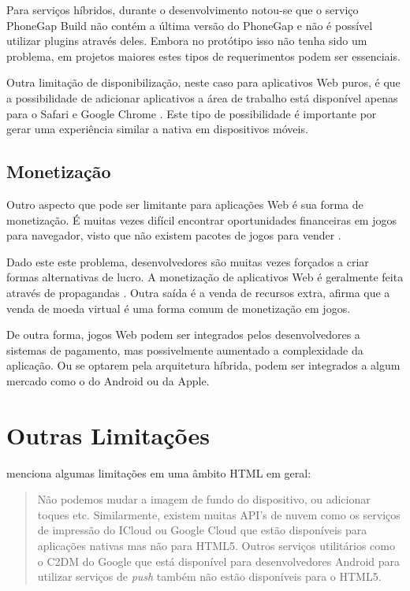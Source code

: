 Para serviços híbridos, durante o desenvolvimento notou-se que o
serviço PhoneGap Build não contém a última versão do PhoneGap e
não é possível utilizar plugins através deles. Embora no protótipo
isso não tenha sido um problema, em projetos maiores estes tipos de
requerimentos podem ser essenciais.

Outra limitação de disponibilização, neste caso para aplicativos
Web puros, é que a possibilidade de adicionar aplicativos a área
de trabalho está disponível apenas para o Safari e Google Chrome
. Este tipo de possibilidade é importante por
gerar uma experiência similar a nativa em dispositivos móveis.

\subsection{Monetização}

Outro aspecto que pode ser limitante para aplicações Web é
sua forma de monetização. É muitas vezes difícil encontrar
oportunidades financeiras em jogos para navegador, visto que não
existem pacotes de jogos para vender \autocite[p. 44]{gameCommunities}
.

Dado este este problema, desenvolvedores são muitas vezes forçados
a criar formas alternativas de lucro. A monetização de aplicativos
Web é geralmente feita através de propagandas \autocite[p.
44]{gameCommunities}. Outra saída é a venda de recursos extra,
\citet[p. 44]{gameCommunities} afirma que a venda de moeda virtual é
uma forma comum de monetização em jogos.

De outra forma, jogos Web podem ser integrados pelos desenvolvedores
a sistemas de pagamento, mas possivelmente aumentado a complexidade
da aplicação. Ou se optarem pela arquitetura híbrida, podem ser
integrados a algum mercado como o do Android ou da Apple.

\section{Outras Limitações}

\citet{html5Tradeoffs} menciona algumas limitações em uma âmbito HTML em geral:

\begin{quote}
Não podemos mudar a imagem de fundo do dispositivo, ou adicionar toques
etc. Similarmente, existem muitas API's de nuvem como os serviços
de impressão do ICloud ou Google Cloud que estão disponíveis para
aplicações nativas mas não para HTML5. Outros serviços utilitários
como o C2DM do Google que está disponível para desenvolvedores Android
para utilizar serviços de \textit{push} também não estão disponíveis
para o HTML5.
\end{quote}

